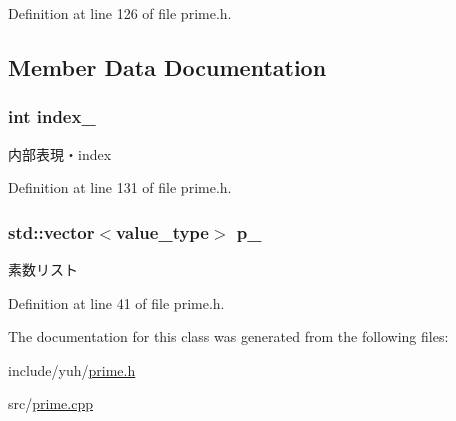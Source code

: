 \-Definition at line 126 of file prime.\-h.



\subsection{\-Member \-Data \-Documentation}
\hypertarget{classyuh_1_1range__detail_1_1prime__iterator_aaaf1ac02dfa554a3cdffc647d512a77b}{
\subsubsection[{index\-\_\-}]{\setlength{\rightskip}{0pt plus 5cm}int {\bf index\-\_\-}}}\label{d9/dc8/classyuh_1_1range__detail_1_1prime__iterator_aaaf1ac02dfa554a3cdffc647d512a77b}
内部表現・index 

\-Definition at line 131 of file prime.\-h.

\hypertarget{classyuh_1_1range__detail_1_1prime__iterator_aff6d0a0fbc14123c0fca5a0c05d2e68c}{
\subsubsection[{p\-\_\-}]{\setlength{\rightskip}{0pt plus 5cm}std\-::vector$<${\bf value\-\_\-type}$>$ {\bf p\-\_\-}}}\label{d9/dc8/classyuh_1_1range__detail_1_1prime__iterator_aff6d0a0fbc14123c0fca5a0c05d2e68c}
素数リスト 

\-Definition at line 41 of file prime.\-h.



\-The documentation for this class was generated from the following files\-:\begin{DoxyCompactItemize}
\item 
include/yuh/\hyperlink{prime_8h}{prime.\-h}\item 
src/\hyperlink{prime_8cpp}{prime.\-cpp}\end{DoxyCompactItemize}
